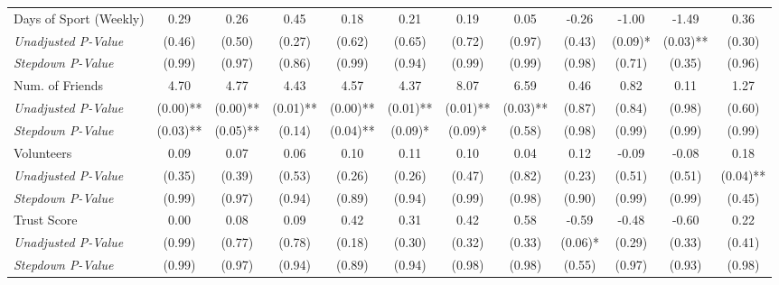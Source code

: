 \begin{tabular}{l c c c c c c c c c c c}
Days of Sport (Weekly) & 0.29 & 0.26 & 0.45 & 0.18 & 0.21 & 0.19 & 0.05 & -0.26 & -1.00 & -1.49 & 0.36 \\
\quad \textit{Unadjusted P-Value} & (0.46) & (0.50) & (0.27) & (0.62) & (0.65) & (0.72) & (0.97) & (0.43) & (0.09)* & (0.03)** & (0.30) \\
\quad \textit{Stepdown P-Value} & (0.99) & (0.97) & (0.86) & (0.99) & (0.94) & (0.99) & (0.99) & (0.98) & (0.71) & (0.35) & (0.96) \\
Num. of Friends & 4.70 & 4.77 & 4.43 & 4.57 & 4.37 & 8.07 & 6.59 & 0.46 & 0.82 & 0.11 & 1.27 \\
\quad \textit{Unadjusted P-Value} & (0.00)** & (0.00)** & (0.01)** & (0.00)** & (0.01)** & (0.01)** & (0.03)** & (0.87) & (0.84) & (0.98) & (0.60) \\
\quad \textit{Stepdown P-Value} & (0.03)** & (0.05)** & (0.14) & (0.04)** & (0.09)* & (0.09)* & (0.58) & (0.98) & (0.99) & (0.99) & (0.99) \\
Volunteers & 0.09 & 0.07 & 0.06 & 0.10 & 0.11 & 0.10 & 0.04 & 0.12 & -0.09 & -0.08 & 0.18 \\
\quad \textit{Unadjusted P-Value} & (0.35) & (0.39) & (0.53) & (0.26) & (0.26) & (0.47) & (0.82) & (0.23) & (0.51) & (0.51) & (0.04)** \\
\quad \textit{Stepdown P-Value} & (0.99) & (0.97) & (0.94) & (0.89) & (0.94) & (0.99) & (0.98) & (0.90) & (0.99) & (0.99) & (0.45) \\
Trust Score & 0.00 & 0.08 & 0.09 & 0.42 & 0.31 & 0.42 & 0.58 & -0.59 & -0.48 & -0.60 & 0.22 \\
\quad \textit{Unadjusted P-Value} & (0.99) & (0.77) & (0.78) & (0.18) & (0.30) & (0.32) & (0.33) & (0.06)* & (0.29) & (0.33) & (0.41) \\
\quad \textit{Stepdown P-Value} & (0.99) & (0.97) & (0.94) & (0.89) & (0.94) & (0.98) & (0.98) & (0.55) & (0.97) & (0.93) & (0.98) \\
\bottomrule
\end{tabular}
